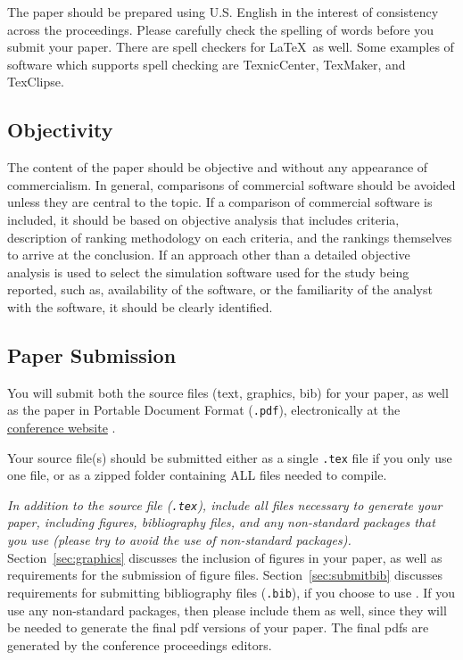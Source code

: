 \documentclass{wscpaperproc}
\theoremstyle{wsc}
\begin{document}
The paper should be prepared using U.S. English in the interest of consistency across the proceedings. Please carefully check the spelling of words before you submit your paper. There are spell checkers for \LaTeX\ as well.
Some examples of software which supports spell checking are TexnicCenter, TexMaker, and TexClipse.

\subsection{Objectivity}
The content of the paper should be objective and without any appearance of commercialism.  In general, comparisons of commercial software should be avoided unless they are central to the topic.  If a comparison of commercial software is included, it should be based on objective analysis that includes criteria, description of ranking methodology on each criteria, and the rankings themselves to arrive at the conclusion.
If an approach other than a detailed objective analysis is used to select the simulation software used for the study being reported, such as, availability of the software, or the familiarity of the analyst with the software, it should be clearly identified.

\subsection{Paper Submission}
You will submit both the source files (text, graphics, bib) for your paper, as well as the paper in Portable Document Format ({\tt .pdf}), electronically at the \href{http://www.wintersim.org}{conference website} \cite{WSC}.

Your source file(s) should be submitted either as a single {\tt .tex} file if you only use
one file, or as a zipped folder containing ALL files needed to compile.

{\em In addition to the source file ({\tt .tex}), include all files necessary to generate your paper, including figures, bibliography files, and any non-standard packages that you use (please try to avoid the use of non-standard packages).} Section~\ref{sec:graphics} discusses the inclusion of figures in your paper, as well as requirements for the submission of figure files.
Section~\ref{sec:submitbib} discusses requirements for submitting bibliography files ({\tt .bib}), if you choose to use \BibTeX. If you use any non-standard packages, then please include them as well, since they will be needed to generate the final pdf versions of your paper.
The final pdfs are generated by the conference proceedings editors.
\end{document}
